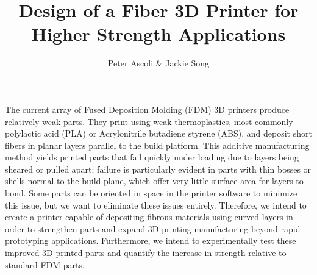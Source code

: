 \documentclass[letter,10pt]{article}
\begin{document}
\title{Design of a Fiber 3D Printer for Higher Strength Applications}
\author{Peter Ascoli \& Jackie Song}
\date{}
\maketitle


The current array of Fused Deposition Molding (FDM) 3D printers produce relatively weak parts. They print using weak thermoplastics, most commonly polylactic acid (PLA) or Acrylonitrile butadiene styrene (ABS), and deposit short fibers in planar layers parallel to the build platform. This additive manufacturing method yields printed parts that fail quickly under loading due to layers being sheared or pulled apart; failure is particularly evident in parts with thin bosses or shells normal to the build plane, which offer very little surface area for layers to bond. Some parts can be oriented in space in the printer software to minimize this issue, but we want to eliminate these issues entirely. Therefore, we intend to create a printer capable of depositing fibrous materials using curved layers in order to strengthen parts and expand 3D printing manufacturing beyond rapid prototyping applications. Furthermore, we intend to experimentally test these improved 3D printed parts and quantify the increase in strength relative to standard FDM parts.

\end{document}
